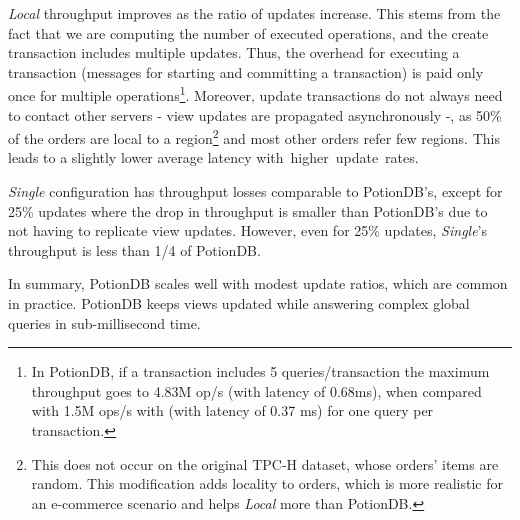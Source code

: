 \documentclass[sigplan,twocolumn,review,anonymous]{acmart}
\begin{document}
\textit{Local} throughput improves as the ratio of updates increase.  This stems from the fact that we 
are computing the number of executed operations, and the create transaction includes multiple updates. 
Thus, the overhead for executing a transaction (messages for starting and committing a transaction) is paid
only once for multiple operations\footnote{In PotionDB, if a transaction includes 5 queries/transaction the maximum throughput 
goes to 4.83M op/s (with latency of 0.68ms), when compared with 1.5M ops/s with (with latency of 0.37 ms) for one query per transaction.}.  
Moreover, update transactions do not always need to contact other servers - view updates are propagated asynchronously -,  
as 50\% of the orders are local to a region\footnote{This does not occur on the original TPC-H dataset, 
whose orders' items are random. This modification adds locality to orders, which is more realistic for 
an e-commerce scenario and helps \textit{Local} more than PotionDB.} and most other orders
refer few regions.  This leads to a slightly lower average latency \mbox{with higher update rates.}

\textit{Single} configuration has throughput losses comparable to PotionDB's, except for 25\% updates where the drop in throughput is smaller 
than PotionDB's due to not having to replicate view updates.
However, even for 25\% updates, \textit{Single}'s throughput is less than 1/4 of PotionDB.

In summary, PotionDB scales well with modest update ratios, which are common in practice.
PotionDB keeps views updated while answering complex global queries in sub-millisecond time.
\end{document}
